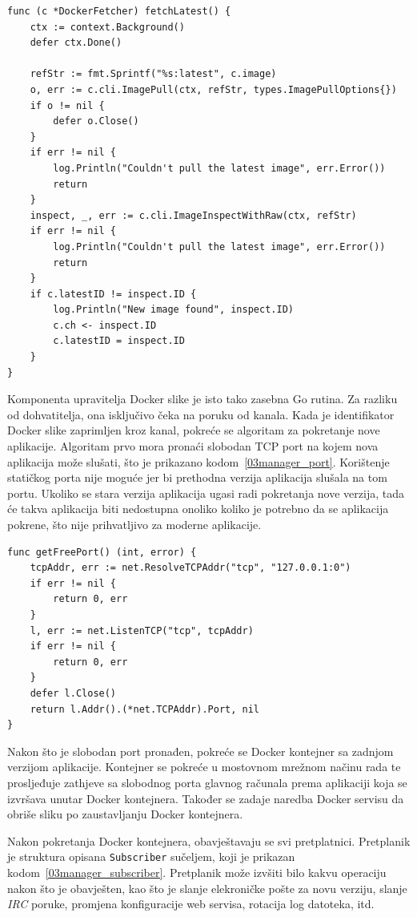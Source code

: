 \begin{lstlisting}[float=h]
func (c *DockerFetcher) fetchLatest() {
	ctx := context.Background()
	defer ctx.Done()

	refStr := fmt.Sprintf("%s:latest", c.image)
	o, err := c.cli.ImagePull(ctx, refStr, types.ImagePullOptions{})
	if o != nil {
		defer o.Close()
	}
	if err != nil {
		log.Println("Couldn't pull the latest image", err.Error())
		return
	}
	inspect, _, err := c.cli.ImageInspectWithRaw(ctx, refStr)
	if err != nil {
		log.Println("Couldn't pull the latest image", err.Error())
		return
	}
	if c.latestID != inspect.ID {
		log.Println("New image found", inspect.ID)
		c.ch <- inspect.ID
		c.latestID = inspect.ID
	}
}
\end{lstlisting}

Komponenta upravitelja Docker slike je isto tako zasebna Go rutina. Za razliku od dohvatitelja, ona
isključivo čeka na poruku od kanala. Kada je identifikator Docker slike zaprimljen kroz kanal,
pokreće se algoritam za pokretanje nove aplikacije. Algoritam prvo mora pronaći slobodan TCP port na
kojem nova aplikacija može slušati, što je prikazano kodom~\ref{03manager_port}. Korištenje
statičkog porta nije moguće jer bi prethodna verzija aplikacija slušala na tom portu. Ukoliko se
stara verzija aplikacija ugasi radi pokretanja nove verzija, tada će takva aplikacija biti nedostupna
onoliko koliko je potrebno da se aplikacija pokrene, što nije prihvatljivo za moderne aplikacije.

\begin{lstlisting}[float=h]
func getFreePort() (int, error) {
	tcpAddr, err := net.ResolveTCPAddr("tcp", "127.0.0.1:0")
	if err != nil {
		return 0, err
	}
	l, err := net.ListenTCP("tcp", tcpAddr)
	if err != nil {
		return 0, err
	}
	defer l.Close()
	return l.Addr().(*net.TCPAddr).Port, nil
}
\end{lstlisting}

Nakon što je slobodan port pronađen, pokreće se Docker kontejner sa zadnjom verzijom aplikacije.
Kontejner se pokreće u mostovnom mrežnom načinu rada te prosljeđuje zathjeve sa slobodnog porta
glavnog računala prema aplikaciji koja se izvršava unutar Docker kontejnera. Također se zadaje
naredba Docker servisu da obriše sliku po zaustavljanju Docker kontejnera.

Nakon pokretanja Docker kontejnera, obavještavaju se svi pretplatnici. Pretplanik je struktura
opisana \texttt{Subscriber} sučeljem, koji je prikazan kodom~\ref{03manager_subscriber}. Pretplanik
može izvšiti bilo kakvu operaciju nakon što je obavješten, kao što je slanje elekroničke pošte za
novu verziju, slanje \textit{IRC} poruke, promjena konfiguracije web servisa, rotacija log datoteka,
itd.

